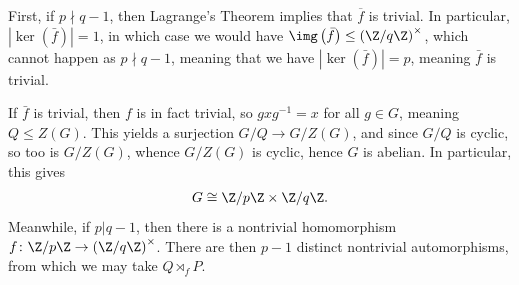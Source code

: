 \documentclass[10pt]{mypackage}
\begin{document}
First, if $p\nmid q-1$, then Lagrange's Theorem implies that $ \overline{f} $ is trivial. In particular, $\left\vert \ker\left( \bar{f} \right) \right\vert = 1$, in which case we would have $\img\left( \bar{f} \right)\leq \left( \Z/q\Z \right)^{\times}$, which cannot happen as $p\nmid q-1$, meaning that we have $\left\vert \ker\left( \bar{f} \right) \right\vert = p$, meaning $ \bar{f} $ is trivial.%

If $ \bar{f} $ is trivial, then $f$ is in fact trivial, so $gxg^{-1} = x$ for all $g\in G$, meaning $Q\leq Z(G)$. This yields a surjection $G/Q\rightarrow G/Z(G)$, and since $G/Q$ is cyclic, so too is $G/Z(G)$, whence $G/Z(G)$ is cyclic, hence $G$ is abelian. In particular, this gives
\begin{align*}
  G\cong \Z/p\Z \times \Z/q\Z.
\end{align*}
Meanwhile, if $p | q-1$, then there is a nontrivial homomorphism $ f\colon \Z/p\Z\rightarrow \left( \Z/q\Z \right)^{\times} $. There are then $p-1$ distinct nontrivial automorphisms, from which we may take $Q\rtimes_{f}P$.%
\end{document}
